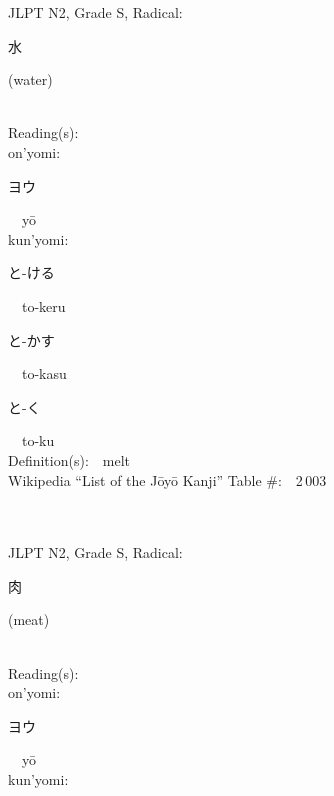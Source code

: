 \begin{multicols}{2}
{JLPT N2, Grade S, Radical:\ \ {\begin{CJK}{UTF8}{min} 水 \end{CJK}} (water) } \\
Reading(s):\ \ \\
{\hspace*{1em}}on'yomi:\ \ \\
{\hspace*{2em}}{\begin{CJK}{UTF8}{min} ヨウ \end{CJK}}\ \ y\=o\ \ \\
{\hspace*{1em}}kun'yomi:\ \ \\
{\hspace*{2em}}{\begin{CJK}{UTF8}{min} と-ける \end{CJK}}\ \ to-keru\ \ \\
{\hspace*{2em}}{\begin{CJK}{UTF8}{min} と-かす \end{CJK}}\ \ to-kasu\ \ \\
{\hspace*{2em}}{\begin{CJK}{UTF8}{min} と-く \end{CJK}}\ \ to-ku\ \ \\
Definition(s):\ \ melt \\
Wikipedia ``List of the J\=oy\=o Kanji'' Table \#:\ \ 2\,003 \\
\ \ \\
{\fontsize{34pt}{40pt}  }\ \ \\  %
{JLPT N2, Grade S, Radical:\ \ {\begin{CJK}{UTF8}{min} 肉 \end{CJK}} (meat) } \\
Reading(s):\ \ \\
{\hspace*{1em}}on'yomi:\ \ \\
{\hspace*{2em}}{\begin{CJK}{UTF8}{min} ヨウ \end{CJK}}\ \ y\=o\ \ \\
{\hspace*{1em}}kun'yomi:\ \ \\

\end{multicols}
